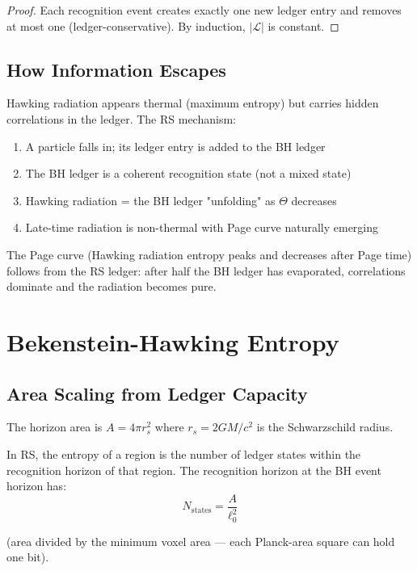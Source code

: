 \documentclass[12pt,a4paper]{article}
\theoremstyle{definition}
\theoremstyle{remark}
\begin{document}
\begin{proof}
Each recognition event creates exactly one new ledger entry and removes
at most one (ledger-conservative). By induction, $|\mathcal{L}|$ is constant.
\end{proof}

\subsection{How Information Escapes}

Hawking radiation appears thermal (maximum entropy) but carries hidden correlations 
in the ledger. The RS mechanism:

\begin{enumerate}
\item A particle falls in; its ledger entry is added to the BH ledger
\item The BH ledger is a coherent recognition state (not a mixed state)
\item Hawking radiation = the BH ledger "unfolding" as $\Theta$ decreases
\item Late-time radiation is non-thermal with Page curve naturally emerging
\end{enumerate}

The Page curve (Hawking radiation entropy peaks and decreases after Page time) 
follows from the RS ledger: after half the BH ledger has evaporated, correlations 
dominate and the radiation becomes pure.

\section{Bekenstein-Hawking Entropy}

\subsection{Area Scaling from Ledger Capacity}

The horizon area is $A = 4\pi r_s^2$ where $r_s = 2GM/c^2$ is the Schwarzschild radius.

In RS, the entropy of a region is the number of ledger states within the recognition 
horizon of that region. The recognition horizon at the BH event horizon has:
\begin{equation}
N_\mathrm{states} = \frac{A}{\ell_0^2}
\end{equation}

(area divided by the minimum voxel area — each Planck-area square can hold one bit).
\end{document}
